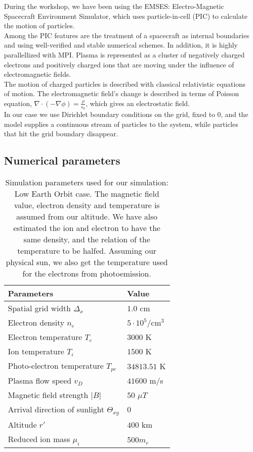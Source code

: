 \documentclass[aip, 
rsi, 
amsmath,
amssymb,
longbibliography,
preprint]{revtex4-1}
\begin{document}
During the workshop, we have been using the EMSES: Electro-Magnetic Spacecraft Environment Simulator, which uses particle-in-cell (PIC) to calculate the motion of particles.\\

Among the PIC features are the treatment of a spacecraft as internal boundaries and using well-verified and stable numerical schemes. In addition, it is highly parallellized with MPI. Plasma is represented as a cluster\cite{numsetup} of negatively charged electrons and positively charged ions that are moving under the influence of electromagnetic fields.\\

The motion of charged particles is described with classical relativistic equations of motion. The electromagnetic field’s change is described in terms of Poisson equation, $\nabla\cdot(-\nabla \phi)=\frac{\rho}{\epsilon_0}$, which gives an electrostatic field\cite{numsetup2}.\\

In our case we use Dirichlet boundary conditions on the grid, fixed to 0, and the model supplies a continuous stream of particles to the system, while particles that hit the grid boundary disappear.

\subsection{Numerical parameters}

\begin{table}
  \centering
  \caption{Simulation parameters used for our simulation: Low Earth Orbit case. The magnetic field value, electron density and temperature is assumed from our altitude. We have also estimated the ion and electron to have the same density, and the relation of the temperature to be halfed. Assuming our physical sun, we also get the temperature used for the electrons from photoemission.\label{tab:table1}}
\begin{tabular}{|l|l|}
\hline
\hline
  Parameters & Value  \\
  \hline
   Spatial grid width \(\Delta_x\) & \(1.0\) cm \\
   Electron density \(n_e\) & \(5 \cdot 10^5\)/cm$^3$   \\
   Electron temperature \(T_e\) & \(3000\) K   \\
   Ion temperature \(T_i\) & \(1500\) K \\
   Photo-electron temperature \(T_{pe}\) & \(34813.51\) K  \\
   Plasma flow speed \(v_D\)  & \(41600\) m/s  \\
   Magnetic field strength \(|B|\) & \(50 \)  \(\mu T\) \\
   Arrival direction of sunlight \(\Theta_{xy}\) & \(0\)\\
   Altitude \(r'\) & \(400\) km \\
   Reduced ion mass $\mu_i$ & 500$m_e$ \\
   \hline
\hline
\end{tabular}
\end{table}
\end{document}
